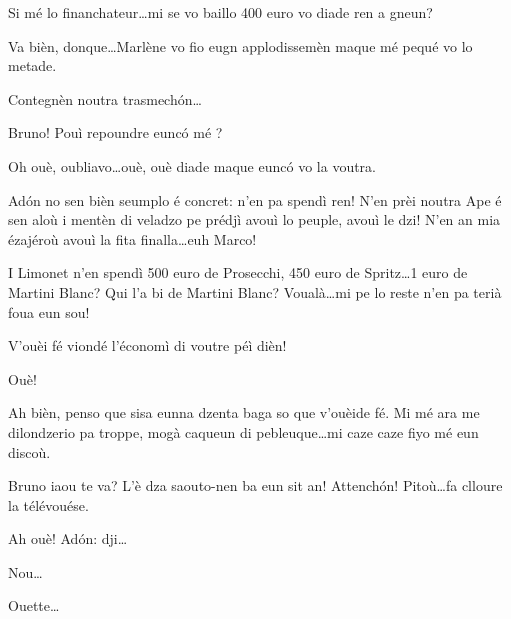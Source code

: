 \begin{drama}

\Dallasspeaks{} Si mé lo financhateur\ldots mi se vo baillo  400 euro vo diade ren a gneun?


\Brunospeaks Va bièn, donque\ldots Marlène vo fio eugn applodissemèn maque mé pequé vo lo metade.


\Brunospeaks Contegnèn noutra trasmech\'on\ldots

\Jordyspeaks Bruno!  Pouì repoundre eunc\'o mé ?

\Brunospeaks  Oh ouè, oubliavo\ldots ouè, ouè diade maque eunc\'o vo la voutra.

\Jordyspeaks  Ad\'on no sen bièn seumplo é concret: n'en pa spendì ren! N'en prèi noutra Ape é sen aloù i mentèn di veladzo pe prédjì avouì lo peuple, avouì le dzi! N'en an mia ézajéroù avouì la fita finalla\ldots euh Marco!


\Jordyspeaks I Limonet n'en spendì 500 euro de Prosecchi, 450 euro de Spritz\ldots 1 euro de Martini Blanc?  Qui l'a bi de Martini Blanc? Voualà\ldots mi pe lo reste n'en pa terià foua eun sou!

\Brunospeaks V'ouèi fé viondé l'économì di voutre péì dièn!

\Jordyspeaks Ouè!

\Brunospeaks Ah bièn, penso que sisa eunna dzenta baga so que v'ouèide fé.  Mi mé ara me dilondzerio pa troppe, mogà caqueun di pebleuque\ldots mi caze caze fiyo mé eun discoù.


\Noteospeaks Bruno iaou te va? L'è dza saouto-nen ba eun sit an! Attench\'on! Pitoù\ldots fa clloure la télévouése.

\Brunospeaks Ah ouè! Ad\'on: dji\ldots

\Noteospeaks Nou\ldots

\Brunospeaks Ouette\ldots


\end{drama}
